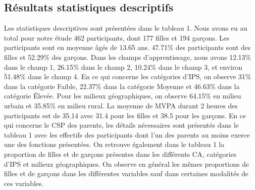 \documentclass[12pt,a4paper]{article}
\begin{document}
	\subsection{Résultats statistiques descriptifs}
	Les statistiques descriptives sont présentées dans le tableau 1. Nous avons eu au total pour notre étude 462 participants, dont 177 filles et 194 garçons. Les participants sont en moyenne âgés de 13.65 ans. 47.71\% des participants sont des filles et 52.29\% des garçons. Dans les champs d'apprentissage, nous avons 12.13\% dans le champ 1, 26.15\% dans le champ 2, 10.24\% dans le champ 3, et environ 51.48\% dans le champ 4. En ce qui concerne les catégories d'IPS, on observe 31\% dans la catégorie Faible, 22.37\% dans la catégorie Moyenne et 46.63\% dans la catégorie Élevée. Pour les milieux géographiques, on observe 64.15\% en milieu urbain et 35.85\% en milieu rural. La moyenne de MVPA durant 2 heures des participants est de 35.14 avec 31.4 pour les filles et 38.5 pour les garçons. En ce qui concerne le CSP des parents, les détails nécessaires sont présentés dans le tableau 1 avec les effectifs des participants dont l'un des parents au moins exerce une des fonctions présentées. On retrouve également dans le tableau 1 la proportion de filles et de garçons présentes dans les différents CA, catégories d'IPS et milieux géographiques. On observe en général les mêmes proportions de filles et de garçons dans les différentes variables sauf dans certaines modalités de ces variables.
	
\end{document}
